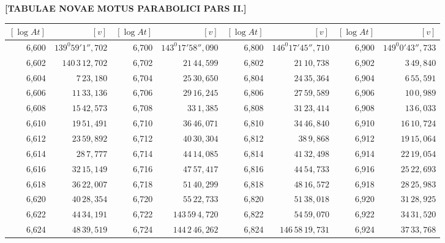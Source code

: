\clearpage
{}
\begingroup
\centering
\fontsize{9}{9}\selectfont
\setlength{\tabcolsep}{.75pt}
\renewcommand{\arraystretch}{.9}
\setlength{\parskip}{0pt}
\textbf{[TABULAE NOVAE MOTUS PARABOLICI PARS II.]}
\par\vspace{7pt}
\begin{tabular}{|r|r||r|r||r|r||r|r|}
\hline
\([\log At]\) & \([v]\) & \([\log At]\) & \([v]\) & \([\log At]\) & \([v]\) & \([\log At]\) & \([v]\) \\
\hline
6,600 & \(139^{0}59'1'',\!702\) & 6,700 & \(143^{0}17'58'',\!090\) & 6,800 & \(146^{0}17'45'',\!710\) & 6,900 & \(149^{0}0'43'',\!733\) \\[1pt]
6,602 & \(140\,3\,12,\!702\) & 6,702 & \(21\,44,\!599\) & 6,802 & \(21\,10,\!738\) & 6,902 & \(3\,49,\!840\) \\
6,604 & \(7\,23,\!180\) & 6,704 & \(25\,30,\!650\) & 6,804 & \(24\,35,\!364\) & 6,904 & \(6\,55,\!591\) \\
6,606 & \(11\,33,\!136\) & 6,706 & \(29\,16,\!245\) & 6,806 & \(27\,59,\!589\) & 6,906 & \(10\,0,\!989\) \\
6,608 & \(15\,42,\!573\) & 6,708 & \(33\,1,\!385\) & 6,808 & \(31\,23,\!414\) & 6,908 & \(13\,6,\!033\) \\
6,610 & \(19\,51,\!491\) & 6,710 & \(36\,46,\!071\) & 6,810 & \(34\,46,\!840\) & 6,910 & \(16\,10,\!724\) \\[1pt]
6,612 & \(23\,59,\!892\) & 6,712 & \(40\,30,\!304\) & 6,812 & \(38\,9,\!868\) & 6,912 & \(19\,15,\!064\) \\
6,614 & \(28\,7,\!777\) & 6,714 & \(44\,14,\!085\) & 6,814 & \(41\,32,\!498\) & 6,914 & \(22\,19,\!054\) \\
6,616 & \(32\,15,\!149\) & 6,716 & \(47\,57,\!417\) & 6,816 & \(44\,54,\!733\) & 6,916 & \(25\,22,\!693\) \\
6,618 & \(36\,22,\!007\) & 6,718 & \(51\,40,\!299\) & 6,818 & \(48\,16,\!572\) & 6,918 & \(28\,25,\!983\) \\
6,620 & \(40\,28,\!354\) & 6,720 & \(55\,22,\!733\) & 6,820 & \(51\,38,\!018\) & 6,920 & \(31\,28,\!925\) \\[1pt]
6,622 & \(44\,34,\!191\) & 6,722 & \(143\,59\,4,\!720\) & 6,822 & \(54\,59,\!070\) & 6,922 & \(34\,31,\!520\) \\
6,624 & \(48\,39,\!519\) & 6,724 & \(144\,2\,46,\!262\) & 6,824 & \(146\,58\,19,\!731\) & 6,924 & \(37\,33,\!768\) \\

\end{tabular}
